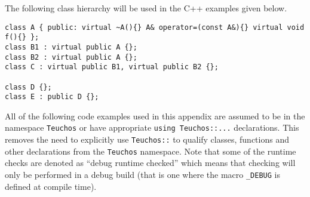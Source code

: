 \documentclass[pdf,ps2pdf,11pt]{SANDreport}
\begin{document}
The following class hierarchy will be used in the C++ examples given
below.

{\small\begin{verbatim}
class A { public: virtual ~A(){} A& operator=(const A&){} virtual void f(){} };
class B1 : virtual public A {};
class B2 : virtual public A {};
class C : virtual public B1, virtual public B2 {};

class D {};
class E : public D {};
\end{verbatim}}

All of the following code examples used in this appendix are assumed
to be in the namespace {}\texttt{Teuchos} or have appropriate
{}\texttt{using Teuchos::...} declarations.  This removes the need to
explicitly use {}\texttt{Teuchos::} to qualify classes, functions and
other declarations from the {}\texttt{Teuchos} namespace.  Note that
some of the runtime checks are denoted as ``debug runtime checked''
which means that checking will only be performed in a debug build
(that is one where the macro {}\texttt{\_DEBUG} is defined at compile time).
\end{document}

